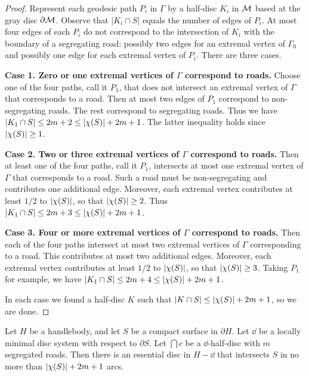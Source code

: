 \begin{proof}
Represent each geodesic path $P_{i}$ in $\Gamma$ by a half-disc $K_{i}$ in $\mathcal{M}$ based at the gray disc $\partial\mathcal{M}$.  Observe that $|K_{i}\cap S|$ equals the number of edges of $P_{i}$.  At most four edges of each $P_{i}$ do not correspond to the intersection of $K_{i}$ with the boundary of a segregating road: possibly two edges for an extremal vertex of $\Gamma_{0}$ and possibly one edge for each extremal vertex of $P_{i}$.  There are three cases.

\textbf{Case 1. Zero or one extremal vertices of $\Gamma$ correspond to roads.}
Choose one of the four paths, call it $P_{1}$, that does not intersect an extremal vertex of $\Gamma$ that corresponds to a road.  Then at most two edges of $P_{1}$ correspond to non-segregating roads.  The rest correspond to segregating roads.  Thus we have $|K_{1}\cap S|\leq 2m+2 \leq | \chi (S) |+2m+1$.  The latter inequality holds since $| \chi (S) |\geq 1$.

\textbf{Case 2. Two or three extremal vertices of $\Gamma$ correspond to roads.}
Then at least one of the four paths, call it $P_{1}$, intersects at most one extremal vertex of $\Gamma$ that corresponds to a road.  Such a road must be non-segregating and contributes one additional edge.  Moreover, each extremal vertex contributes at least $1/2$ to $| \chi (S) |$, so that $| \chi (S) |\geq 2$.  Thus $|K_{1}\cap S|\leq 2m+3 \leq | \chi (S) |+2m+1$.

\textbf{Case 3. Four or more extremal vertices of $\Gamma$ correspond to roads.}
Then each of the four paths intersect at most two extremal vertices of $\Gamma$ corresponding to a road.  This contributes at most two additional edges.  Moreover, each extremal vertex contributes at least $1/2$ to $| \chi (S) |$, so that $| \chi (S) |\geq 3$.  Taking $P_{1}$ for example, we have $|K_{1}\cap S|\leq 2m+4 \leq | \chi (S) |+2m+1$.

In each case we found a half-disc $K$ such that $|K\cap S|\leq | \chi (S) |+2m+1$, so we are done.
\end{proof}

\begin{lemma}
\label{main lemma corollary}
Let $H$ be a handlebody, and let $S$ be a compact surface in $\partial H$.
Let $\dd$ be a locally minimal disc system with respect to $\partial S$.
Let $\dint{c}$ be a $\dd$-half-disc with $m$ segregated roads.
Then there is an essential disc in $H-\dd$ that intersects $S$ in no more than
$| \chi (S) |+2m+1$ arcs.
\end{lemma}

